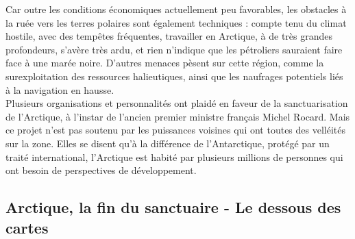 \documentclass[8pt]{article}
\begin{document}
Car outre les conditions économiques actuellement peu favorables, les obstacles à la ruée vers les terres polaires sont également techniques : compte tenu du climat hostile, avec des tempêtes fréquentes, travailler en Arctique, à de très grandes profondeurs, s’avère très ardu, et rien n’indique que les pétroliers sauraient faire face à une marée noire. D’autres menaces pèsent sur cette région, comme la surexploitation des ressources halieutiques, ainsi que les naufrages potentiels liés à la navigation en hausse.\\

Plusieurs organisations et personnalités ont plaidé en faveur de la sanctuarisation de l’Arctique, à l’instar de l’ancien premier ministre français Michel Rocard. Mais ce projet n’est pas soutenu par les puissances voisines qui ont toutes des velléités sur la zone. Elles se disent qu’à la différence de l’Antarctique, protégé par un traité international, l’Arctique est habité par plusieurs millions de personnes qui ont besoin de perspectives de développement.

\begin{center}
\end{center}

\newpage

\subsection{Arctique, la fin du sanctuaire - Le dessous des cartes}
\end{document}
